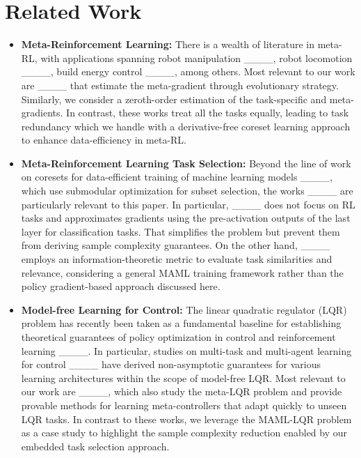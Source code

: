 \section{Related Work}
\label{sec:related}

\begin{itemize}
\item \textbf{Meta-Reinforcement Learning:} There is a wealth of literature in meta-RL, with applications spanning robot manipulation ____, robot locomotion ____, build energy control ____, among others. Most relevant to our work are ____ that estimate the meta-gradient through evolutionary strategy. Similarly, we consider a zeroth-order estimation of the task-specific and meta-gradients. In contrast, these works treat all the tasks equally, leading to task redundancy which we handle with a derivative-free coreset learning approach to enhance data-efficiency in meta-RL. 

\vspace{-0.2cm}
\item \textbf{Meta-Reinforcement Learning Task Selection:} Beyond the line of work on coresets for data-efficient training of machine learning models ____, which use submodular optimization for subset selection, the works ____ are particularly relevant to this paper. In particular, ____ does not focus on RL tasks and approximates gradients using the pre-activation outputs of the last layer for classification tasks. That simplifies the problem but prevent them from deriving sample complexity guarantees. On the other hand, ____ employs an information-theoretic metric to evaluate task similarities and relevance, considering a general MAML training framework rather than the policy gradient-based approach discussed here.

\vspace{-0.2cm}
\item \textbf{Model-free Learning for Control:} The linear quadratic regulator (LQR) problem has recently been taken as a fundamental baseline for establishing theoretical guarantees of policy optimization in control and reinforcement learning ____. In particular, studies on multi-task and multi-agent learning for control ____ have derived non-asymptotic guarantees for various learning architectures within the scope of model-free LQR. Most relevant to our work are ____, which also study the meta-LQR problem and provide provable methods for learning meta-controllers that adapt quickly to unseen LQR tasks. In contrast to these works, we leverage the MAML-LQR problem as a case study to highlight the sample complexity reduction enabled by our embedded task selection approach.
\end{itemize}